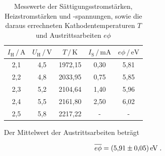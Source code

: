 \begin{table}
  \centering
  \caption{Messwerte der Sättigungsstromstärken, Heizstromstärken und -spannungen, sowie die daraus errechneten
          Kathodentemperaturen $T$ und Austrittsarbeiten $e\phi$}
  \label{tab:mess3}
  \begin{tabular}{c c c c c}
  \toprule
  $I_\text{H} \,/\, \si{\ampere} $ & $U_\text{H} \,/\, \si{\volt}$ & $T \,/\, \si{\kelvin}$
  & $I_\text{S} \,/\, \si{\milli\ampere} $ & $e\phi \,/\, \si{\eV} $\\
  \midrule 
    2,1 & 4,5 & 1972,15 & 0,30 & 5,81 \\
    2,2 & 4,8 & 2033,95 & 0,75 & 5,85 \\
    2,3 & 5,2 & 2104,64 & 1,40 & 5,96 \\
    2,4 & 5,5 & 2161,80 & 2,50 & 6,02 \\
    2,5 & 5,8 & 2217,22 &  -   &  -   \\
  \bottomrule
  \end{tabular}
  \end{table}

Der Mittelwert der Austrittsarbeiten beträgt 

\begin{equation*}
    \overline{e\phi} = \SI{5.91 +- 0.05}{\eV} \; .
\end{equation*}

